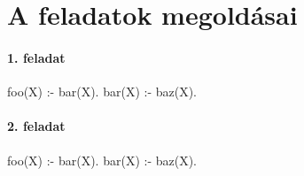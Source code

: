 \chapter{A feladatok megoldásai}
\subsubsection*{1. feladat}
\begin{program}
foo(X) :- bar(X).
bar(X) :- baz(X).
\end{program}
\subsubsection*{2. feladat}
\begin{program}
foo(X) :- bar(X).
bar(X) :- baz(X).
\end{program}

